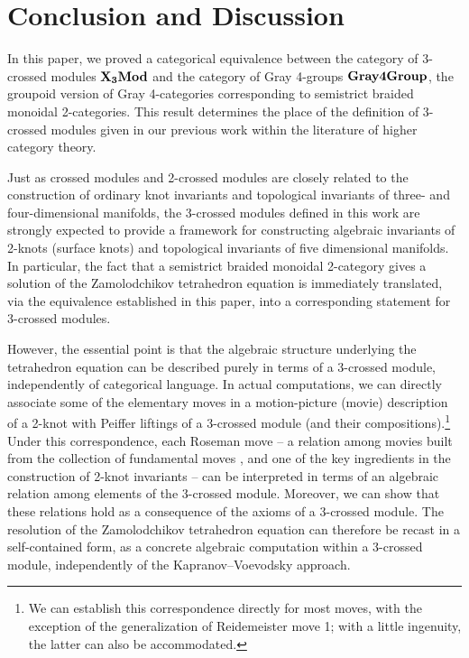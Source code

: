 \documentclass[11pt, reqno]{amsart} %
\newcommand{\TXMod}{{\bf X_3Mod}}
\newcommand{\Gray}{{\bf Gray4Group}}
\theoremstyle{definition}
\theoremstyle{remark}
\numberwithin{equation}{section}
\begin{document}
\section{Conclusion and Discussion}\label{sec:con}
In this paper, we proved a categorical equivalence between the category of 3-crossed modules $\TXMod$ and the category of Gray 4-groups $\Gray$, the groupoid version of Gray 4-categories corresponding to semistrict braided monoidal 2-categories. This result determines the place of the definition of 3-crossed modules given in our previous work \cite{Fukuda:2025} within the literature of higher category theory.

Just as crossed modules and 2-crossed modules are closely related to the construction of ordinary knot invariants and topological invariants of three- and four-dimensional manifolds, the 3-crossed modules defined in this work are strongly expected to provide a framework for constructing algebraic invariants of 2-knots (surface knots) and topological invariants of five dimensional manifolds. In particular, the fact that a semistrict braided monoidal 2-category gives a solution of the Zamolodchikov tetrahedron equation is immediately translated, via the equivalence established in this paper, into a corresponding statement for 3-crossed modules.

However, the essential point is that the algebraic structure underlying the tetrahedron equation can be described purely in terms of a 3-crossed module, independently of categorical language. In actual computations, we can directly associate some of the elementary moves in a motion-picture (movie) description of a 2-knot with Peiffer liftings of a 3-crossed module (and their compositions).\footnote{We can establish this correspondence directly for most moves, with the exception of the generalization of Reidemeister move 1; with a little ingenuity, the latter can also be accommodated.} Under this correspondence, each Roseman move -- a relation among movies built from the collection of fundamental moves \cite{Roseman1998}, and one of the key ingredients in the construction of 2-knot invariants -- can be interpreted in terms of an algebraic relation among elements of the 3-crossed module. Moreover, we can show that these relations hold as a consequence of the axioms of a 3-crossed module. The resolution of the Zamolodchikov tetrahedron equation can therefore be recast in a self-contained form, as a concrete algebraic computation within a 3-crossed module, independently of the Kapranov--Voevodsky approach.
\end{document}
